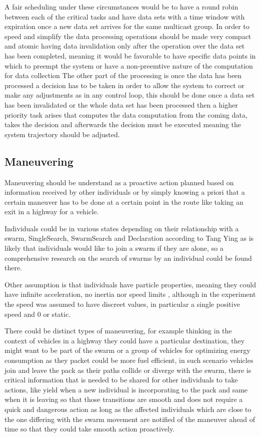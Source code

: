 \documentclass[journal]{IEEEtran}
\begin{document}
A fair scheduling under these circumstances would be to have a round robin between each of the critical tasks and have data sets with a time window with expiration once a new data set arrives for the same multicast group.
In order to speed and simplify the data processing operations should be made very compact and atomic having data invalidation only after the operation over the data set  has been completed, meaning it would be favorable to have specific data points in which to preempt the system or have a non-preemtive nature of the computation for data collection
The other part of the processing is once the data has been processed a decision has to be taken in order to allow the system to correct or make any adjustments as in any control loop, this should be done once a data set has been invalidated or the whole data set has been processed then a higher priority task arises that computes the data computation from the coming data, takes the decision and afterwards the decision must be executed meaning the system trajectory should be adjusted.

\subsection{Maneuvering}
Maneuvering should be understand as a proactive action planned based on information received by other individuals or by simply knowing a priori that a certain maneuver has to be done at a certain point in the route like taking an exit in a highway for a vehicle.

Individuals could be in various states depending on their relationship with a swarm, SingleSearch, SwarmSearch and Declaration according to Tang Ying \cite{HH4} as is likely that individuals would like to join a swarm if they are alone, so a comprehensive research on the search of swarms by an individual could be found there.

Other assumption is that individuals have particle properties, meaning they could have infinite acceleration, no inertia nor speed limits \cite{HH4}, although in the experiment the speed was assumed to have discreet values, in particular a single positive speed and 0 or static.

There could be distinct types of maneuvering, for example thinking in the context of vehicles in a highway they could have a particular destination, they might want to be part of the swarm or a group of vehicles for optimizing energy consumption as they packet could be more fuel efficient, in such scenario vehicles join and leave the pack as their paths collide or diverge with the swarm, there is critical information that is needed to be shared for other individuals to take actions, like yield when a new individual is incorporating to the pack and same when it is leaving so that those transitions are smooth and does not require a quick and dangerous action as long as the affected individuals which are close to the one differing with the swarm movement are notified of the maneuver ahead of time so that they could take smooth action proactively.
\end{document}
